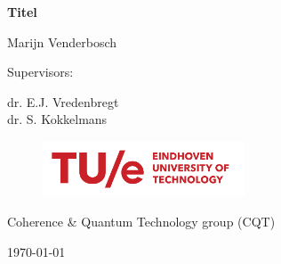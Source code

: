 
\begin{titlepage}
	\begin{centering}
		\vspace*{2cm}
		
		\textsf{\LARGE \textbf{Titel}}
		
		\vspace{2.5cm}
		
		\textsf{\large Marijn Venderbosch}
		
		\vspace{2cm}
		
		\textsf{\large Supervisors:}
		
		\vspace{0.5cm}
		
		\textsf{\large dr. E.J. Vredenbregt\\
			dr. S. Kokkelmans}
		
		\vfill
		
		\begin{figure}[h]
			\centering
			\includegraphics[width=6cm]{figures/logo.png}
		\end{figure}
		
		\textsf{Coherence \& Quantum Technology group (CQT)}
		
		\vspace{0.4cm}		
		
		\textsf{\today}
		
		\vspace{1cm}
		
		
	\end{centering}
\end{titlepage}
\newpage


